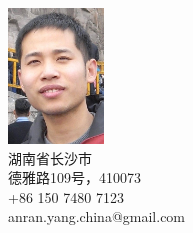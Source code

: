 \begin{nospace}\begin{flushright}
\vspace{-2.7em}
\includegraphics[width=1in]{photo.jpg}\\
湖南省长沙市
\\
德雅路109号，410073
\\
+86 150 7480 7123
\\
anran.yang.china@gmail.com\\
\end{flushright}\end{nospace}


